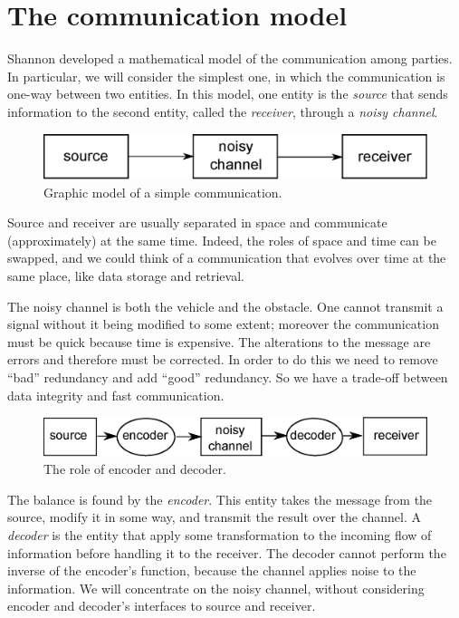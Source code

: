 
\chapter{The communication model}

Shannon developed a mathematical model of the communication among parties.
In particular, we will consider the simplest one, in which the communication is one-way between two entities.
In this model, one entity is the \emph{source} that sends information to the second entity, called the \emph{receiver}, through a \emph{noisy channel}.

\begin{figure}
	\centering
	\includegraphics[width=0.8\linewidth]{pictures/comm-channel.eps}
	\caption{Graphic model of a simple communication.}
\end{figure}

Source and receiver are usually separated in space and communicate (approximately) at the same time.
Indeed, the roles of space and time can be swapped, and we could think of a communication that evolves over time at the same place, like data storage and retrieval.

The noisy channel is both the vehicle and the obstacle.
One cannot transmit a signal without it being modified to some extent; moreover the communication must be quick because time is expensive.
The alterations to the message are errors and therefore must be corrected.
In order to do this we need to remove ``bad'' redundancy and add ``good'' redundancy.
So we have a trade-off between data integrity and fast communication.

\begin{figure}
	\centering
	\includegraphics[width=0.8\linewidth]{pictures/comm-channel1.eps}
	\caption{The role of encoder and decoder.}
\end{figure}

The balance is found by the \emph{encoder}.
This entity takes the message from the source, modify it in some way, and transmit the result over the channel.
A \emph{decoder} is the entity that apply some transformation to the incoming flow of information before handling it to the receiver.
The decoder cannot perform the inverse of the encoder's function, because the channel applies noise to the information.
We will concentrate on the noisy channel, without considering encoder and decoder's interfaces to source and receiver.

